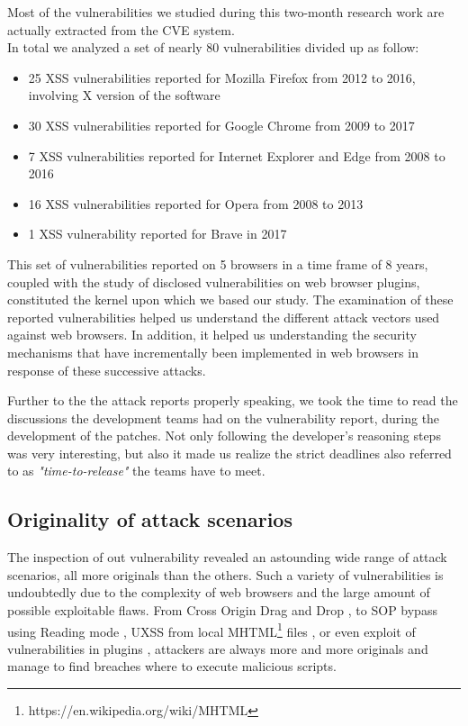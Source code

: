 \documentclass[journal]{IEEEtran}
\begin{document}
Most of the vulnerabilities we studied during this two-month research work are actually extracted from the CVE system. \\

In total we analyzed a set of nearly 80 vulnerabilities divided up as follow:

\begin{itemize}
\item 25 XSS vulnerabilities reported for Mozilla Firefox from 2012 to 2016, involving X version of the software
\item 30 XSS vulnerabilities reported for Google Chrome from 2009 to 2017
\item 7 XSS vulnerabilities reported for Internet Explorer and Edge from 2008 to 2016
\item 16 XSS vulnerabilities reported for Opera from 2008 to 2013
\item 1 XSS vulnerability reported for Brave in 2017
\end{itemize}

This set of vulnerabilities reported on 5 browsers in a time frame of 8 years, coupled with the study of disclosed vulnerabilities on web browser plugins, constituted the kernel upon which we based our study. The examination of these reported vulnerabilities helped us understand the different attack vectors used against web browsers. In addition, it helped us understanding the security mechanisms that have incrementally been implemented in web browsers in response of these successive attacks.

\medskip

Further to the the attack reports properly speaking, we took the time to read the discussions the development teams had on the vulnerability report, during the development of the patches. Not only following the developer's reasoning steps was very interesting, but also it made us realize the strict deadlines also referred to as \emph{"time-to-release"} the teams have to meet.


\subsection{Originality of attack scenarios}

The inspection of out vulnerability revealed an astounding wide range of attack scenarios, all more originals than the others. Such a variety of vulnerabilities is undoubtedly due to the complexity of web browsers and the large amount of possible exploitable flaws. From Cross Origin Drag and Drop \cite{CVE-2013-2849}, to SOP bypass using Reading mode \cite{edgeReadingModeUXSS}, UXSS from local MHTML\footnote{https://en.wikipedia.org/wiki/MHTML} files \cite{CVE-2014-1747}, or even exploit of vulnerabilities in plugins \cite{uxssPDF} \cite{uxssKeybase}, attackers are always more and more originals and manage to find breaches where to execute malicious scripts.
\end{document}
